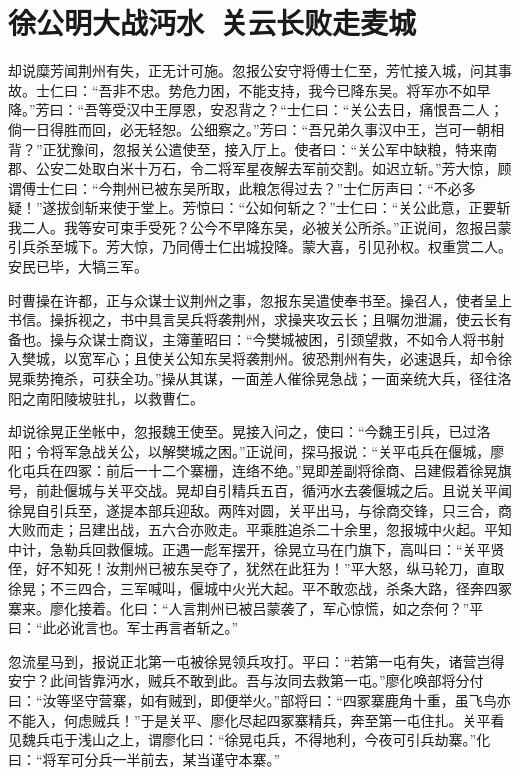 \chapter{徐公明大战沔水~关云长败走麦城}

却说糜芳闻荆州有失，正无计可施。忽报公安守将傅士仁至，芳忙接入城，问其事故。士仁曰：“吾非不忠。势危力困，不能支持，我今已降东吴。将军亦不如早降。”芳曰：“吾等受汉中王厚恩，安忍背之？“士仁曰：“关公去日，痛恨吾二人；倘一日得胜而回，必无轻恕。公细察之。”芳曰：“吾兄弟久事汉中王，岂可一朝相背？”正犹豫间，忽报关公遣使至，接入厅上。使者曰：“关公军中缺粮，特来南郡、公安二处取白米十万石，令二将军星夜解去军前交割。如迟立斩。”芳大惊，顾谓傅士仁曰：“今荆州已被东吴所取，此粮怎得过去？”士仁厉声曰：“不必多疑！”遂拔剑斩来使于堂上。芳惊曰：“公如何斩之？”士仁曰：“关公此意，正要斩我二人。我等安可束手受死？公今不早降东吴，必被关公所杀。”正说间，忽报吕蒙引兵杀至城下。芳大惊，乃同傅士仁出城投降。蒙大喜，引见孙权。权重赏二人。安民已毕，大犒三军。

时曹操在许都，正与众谋士议荆州之事，忽报东吴遣使奉书至。操召人，使者呈上书信。操拆视之，书中具言吴兵将袭荆州，求操夹攻云长；且嘱勿泄漏，使云长有备也。操与众谋士商议，主簿董昭曰：“今樊城被困，引颈望救，不如令人将书射入樊城，以宽军心；且使关公知东吴将袭荆州。彼恐荆州有失，必速退兵，却令徐晃乘势掩杀，可获全功。”操从其谋，一面差人催徐晃急战；一面亲统大兵，径往洛阳之南阳陵坡驻扎，以救曹仁。

却说徐晃正坐帐中，忽报魏王使至。晃接入问之，使曰：“今魏王引兵，已过洛阳；令将军急战关公，以解樊城之困。”正说间，探马报说：“关平屯兵在偃城，廖化屯兵在四冢：前后一十二个寨栅，连络不绝。”晃即差副将徐商、吕建假着徐晃旗号，前赴偃城与关平交战。晃却自引精兵五百，循沔水去袭偃城之后。且说关平闻徐晃自引兵至，遂提本部兵迎敌。两阵对圆，关平出马，与徐商交锋，只三合，商大败而走；吕建出战，五六合亦败走。平乘胜追杀二十余里，忽报城中火起。平知中计，急勒兵回救偃城。正遇一彪军摆开，徐晃立马在门旗下，高叫曰：“关平贤侄，好不知死！汝荆州已被东吴夺了，犹然在此狂为！”平大怒，纵马轮刀，直取徐晃；不三四合，三军喊叫，偃城中火光大起。平不敢恋战，杀条大路，径奔四冢寨来。廖化接着。化曰：“人言荆州已被吕蒙袭了，军心惊慌，如之奈何？”平曰：“此必讹言也。军士再言者斩之。”

忽流星马到，报说正北第一屯被徐晃领兵攻打。平曰：“若第一屯有失，诸营岂得安宁？此间皆靠沔水，贼兵不敢到此。吾与汝同去救第一屯。”廖化唤部将分付曰：“汝等坚守营寨，如有贼到，即便举火。”部将曰：“四冢寨鹿角十重，虽飞鸟亦不能入，何虑贼兵！”于是关平、廖化尽起四冢寨精兵，奔至第一屯住扎。关平看见魏兵屯于浅山之上，谓廖化曰：“徐晃屯兵，不得地利，今夜可引兵劫寨。”化曰：“将军可分兵一半前去，某当谨守本寨。”

